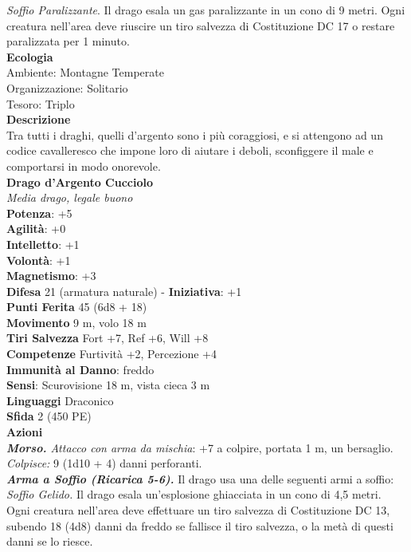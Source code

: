 \begin{multicols}{2}
\emph{Soffio Paralizzante}. Il drago esala un gas paralizzante in un cono di 9 metri. Ogni creatura nell'area deve riuscire un tiro salvezza di Costituzione DC 17 o restare paralizzata per 1 minuto.\\
\textbf{Ecologia}\\
Ambiente: Montagne Temperate\\
Organizzazione: Solitario\\
Tesoro: Triplo\\
\textbf{Descrizione}\\
Tra tutti i draghi, quelli d’argento sono i più coraggiosi, e si attengono ad un codice cavalleresco che impone loro di aiutare i deboli, sconfiggere il male e comportarsi in modo onorevole.\\
\medskip\textbf{Drago d'Argento Cucciolo}\\
\emph{Media drago, legale buono}\\
\textbf{Potenza}: +5\\
\textbf{Agilità}: +0\\
\textbf{Intelletto}: +1\\
\textbf{Volontà}: +1\\
\textbf{Magnetismo}: +3\\
\textbf{Difesa} 21 (armatura naturale) - \textbf{Iniziativa}: +1\\
\textbf{Punti Ferita} 45 (6d8 + 18)\\
\textbf{Movimento} 9 m, volo 18 m\\
\textbf{Tiri Salvezza} Fort +7, Ref +6, Will +8\\
\textbf{Competenze} Furtività +2, Percezione +4\\
\textbf{Immunità al Danno}: freddo\\
\textbf{Sensi}: Scurovisione 18 m, vista cieca 3 m\\
\textbf{Linguaggi} Draconico\\
\textbf{Sfida} 2 (450 PE)\smallskip\\
\smallskip\textbf{Azioni}\\
\emph{\textbf{Morso.} Attacco con arma da mischia}: +7 a colpire, portata 1 m, un bersaglio.\\
\emph{Colpisce:} 9 (1d10 + 4) danni perforanti.\\
\emph{\textbf{Arma a Soffio (Ricarica 5-6).}} Il drago usa una delle seguenti armi a soffio:\\
\emph{Soffio Gelido.} Il drago esala un'esplosione ghiacciata in un cono di 4,5 metri. Ogni creatura nell'area deve effettuare un tiro salvezza di Costituzione DC 13, subendo 18 (4d8) danni da freddo se fallisce il tiro salvezza, o la metà di questi danni se lo riesce.\\

\end{multicols}
